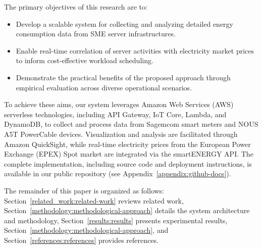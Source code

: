 The primary objectives of this research are to:
\begin{itemize}
\item Develop a scalable system for collecting and analyzing detailed energy consumption data from SME server infrastructures.
\item Enable real-time correlation of server activities with electricity market prices to inform cost-effective workload scheduling.
\item Demonstrate the practical benefits of the proposed approach through empirical evaluation across diverse operational scenarios.
\end{itemize}
To achieve these aims, our system leverages Amazon Web Services (AWS) serverless technologies, including API Gateway, IoT Core, Lambda, and DynamoDB, to collect and process data from Sagemcom smart meters and NOUS A5T PowerCable devices. Visualization and analysis are facilitated through Amazon QuickSight, while real-time electricity prices from the European Power Exchange (EPEX) Spot market are integrated via the smartENERGY API. The complete implementation, including source code and deployment instructions, is available in our public repository (see Appendix~\ref{appendix:github-docs}).

The remainder of this paper is organized as follows: Section~\ref{related_work:related-work} reviews related work, Section~\ref{methodology:methodological-approach} details the system architecture and methodology, Section~\ref{results:results} presents experimental results, Section~\ref{methodology:methodological-approach}, and Section~\ref{references:references} provides references.